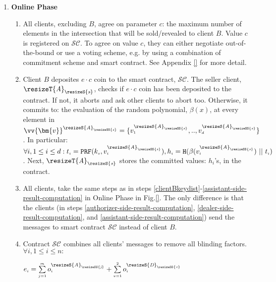 \begin{enumerate}
\begin{enumerate}
\end{enumerate}

\item \textbf{Online Phase} 



\begin{enumerate}
\item All clients, excluding   $B$, agree on parameter $c$: the maximum number of elements in the intersection that will be  sold/revealed to client $B$. Value $c$ is registered on $\mathcal{SC}$. To agree on value $c$, they can either negotiate out-of-the-bound or  use a voting scheme, e.g. by using a combination of commitment scheme and smart contract. See Appendix \ref{} for more detail.

\item Client $B$ deposites $e\cdot c$ coin to the smart contract, $\mathcal{SC}$. The seller client, $\resizeT {\textit A}_{\resizeS {\textit  s}}$,  checks if $e\cdot c$ coin has been deposited to the contract. If not, it aborts and ask other clients to abort too. Otherwise, it commits to: the evaluation of the random polynomial, $\beta(x)$, at every element in $\vv{\bm{v}}^{\resizeS {\textit  A}_{\resizeSS {\textit  s}}}=\{v^{\resizeS {\textit  A}_{\resizeSS {\textit  s}}}_{\scriptscriptstyle 1},..,v^{\resizeS {\textit  A}_{\resizeSS {\textit  s}}}_{\scriptscriptstyle d}\}$.  In particular:  $\forall i, 1\leq i \leq d: t_{\scriptscriptstyle i}=\mathtt{PRF}(k_{\scriptscriptstyle s},v^{\resizeS {\textit  A}_{\resizeSS {\textit  s}}}_{\scriptscriptstyle i}),  h_{\scriptscriptstyle i}= \mathtt{H}(\beta(v^{\resizeS {\textit  A}_{\resizeSS {\textit  s}}}_{\scriptscriptstyle i})\ || \ t_{\scriptscriptstyle i})$.  Next, $\resizeT {\textit A}_{\resizeS {\textit  s}}$ stores the committed values: $h_{\scriptscriptstyle i}$'s, in the contract. 

\item All clients, take the same steps as in steps \ref{clientBkeydist}-\ref{assistant-side-result-computation} in Online Phase in Fig.\ref{}. The only  difference is that the clients  (in steps \ref{authorizer-side-result-computation}, \ref{dealer-side-result-computation}, and \ref{assistant-side-result-computation}) send the messages to  smart contract $\mathcal{SC}$ instead of client $B$. 

\item Contract $\mathcal{SC}$ combines all clients' messages to remove all blinding factors. $\forall i, 1\leq i \leq n :$

$e_{\scriptscriptstyle i}=\sum\limits^{\scriptscriptstyle m}_{\scriptscriptstyle j=1} o^{\resizeS {\textit  A}_{\resizeSS {\textit  j}}}_{\scriptscriptstyle i}+ \sum\limits^{\scriptscriptstyle 2}_{\scriptscriptstyle v=1} o^{\resizeS {\textit  D}_{\resizeSS {\textit  v}}}_{\scriptscriptstyle i}$



\end{enumerate}
\end{enumerate}
